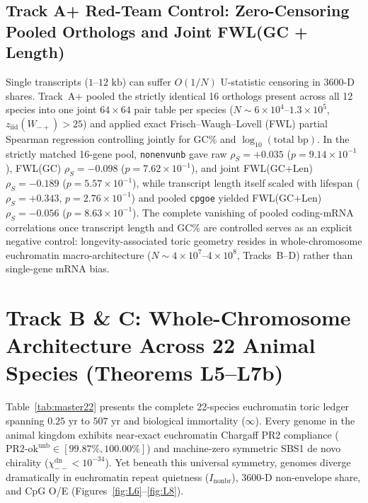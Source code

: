 \documentclass[11pt,a4paper]{article}
\renewcommand{\_}{\origunderscore\penalty200\relax}
\theoremstyle{remark}
\begin{document}
\subsection{Track A+ Red-Team Control: Zero-Censoring Pooled Orthologs and Joint FWL(GC + Length)}
Single transcripts ($1\text{--}12\text{ kb}$) can suffer $O(1/N)$ U-statistic censoring in $3600\text{-D}$ shares. Track~A+ pooled the strictly identical 16 orthologs present across all 12 species into one joint $64\times 64$ pair table per species ($N \sim 6\times 10^4\text{--}1.3\times 10^5$, $z_{\mathrm{iid}}(W_{-+}) > 25$) and applied exact Frisch--Waugh--Lovell (FWL) partial Spearman regression controlling jointly for GC\% and $\log_{10}(\text{total bp})$. In the strictly matched 16-gene pool, \texttt{nonenv\_3600\_unb} gave raw $\rho_S = +0.035$ ($p = 9.14 \times 10^{-1}$), FWL(GC) $\rho_S = -0.098$ ($p = 7.62 \times 10^{-1}$), and joint FWL(GC+Len) $\rho_S = -0.189$ ($p = 5.57 \times 10^{-1}$), while transcript length itself scaled with lifespan ($\rho_S = +0.343$, $p = 2.76 \times 10^{-1}$) and pooled \texttt{cpg\_oe} yielded FWL(GC+Len) $\rho_S = -0.056$ ($p = 8.63 \times 10^{-1}$). The complete vanishing of pooled coding-mRNA correlations once transcript length and GC\% are controlled serves as an explicit negative control: longevity-associated toric geometry resides in whole-chromosome euchromatin macro-architecture ($N \sim 4\times 10^7\text{--}4\times 10^8$, Tracks~B--D) rather than single-gene mRNA bias.

\section{Track B \& C: Whole-Chromosome Architecture Across 22 Animal Species (Theorems L5--L7b)}
Table~\ref{tab:master22} presents the complete 22-species euchromatin toric ledger spanning $0.25\text{ yr}$ to $507\text{ yr}$ and biological immortality ($\infty$).
Every genome in the animal kingdom exhibits near-exact euchromatin Chargaff PR2 compliance ($\mathrm{PR2\text{-}ok}^{\mathrm{unb}} \in [99.87\%, 100.00\%]$) and machine-zero symmetric SBS1 de novo chirality ($\chi_{--}^{\mathrm{dn}} < 10^{-34}$).
Yet beneath this universal symmetry, genomes diverge dramatically in euchromatin repeat quietness ($I_{\mathrm{nonbr}}$), $3600\text{-D}$ non-envelope share, and $\mathrm{CpG}$ O/E (Figures~\ref{fig:L6}--\ref{fig:L8}).
\end{document}
